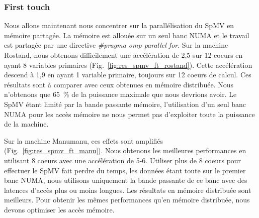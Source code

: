 \subsubsection{First touch}
Nous allons maintenant nous concentrer sur la parallélisation du SpMV en mémoire partagée.
%
La mémoire est allouée sur un seul banc NUMA et le travail est partagée par une directive {\em \#pragma omp parallel for}.
%
Sur la machine Rostand, nous obtenons difficilement une accélération de 2,5 sur 12 coeurs en ayant 8 variables primaires (Fig.~\ref{fig:res_spmv_ft_rostand}).
%
Cette accélération descend à 1,9 en ayant 1 variable primaire, toujours sur 12 coeurs de calcul.
%
Ces résultats sont à comparer avec ceux obtenues en mémoire distribuée.
%
Nous n'obtenons que 65~\% de la puissance maximale que nous devrions avoir.
%
Le SpMV étant limité par la bande passante mémoire, l'utilisation d'un seul banc NUMA pour les accès mémoire ne nous permet pas d'exploiter toute la puissance de la machine.




Sur la machine Manumanu, ces effets sont amplifiés (Fig.~\ref{fig:res_spmv_ft_manu}).
%
Nous obtenons les meilleures performances en utilisant 8 coeurs avec une accélération de 5-6.
%
Utiliser plus de 8 coeurs pour effectuer le SpMV fait perdre du temps, les données étant toute sur le premier banc NUMA, nous utilisons uniquement la bande passante de ce banc avec des latences d'accès plus ou moins longues.
%
Les résultats en mémoire distribuée sont meilleurs.
%
Pour obtenir les mêmes performances qu'en mémoire distribuée, nous devons optimiser les accès mémoire.
